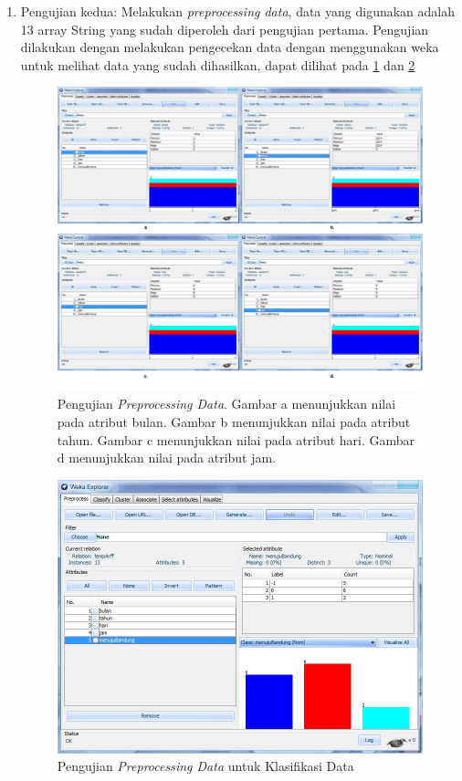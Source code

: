 \begin{enumerate}
	\item Pengujian kedua: Melakukan \textsl{preprocessing data}, data yang digunakan adalah 13 array String yang sudah diperoleh dari pengujian pertama. Pengujian dilakukan dengan melakukan pengecekan data dengan menggunakan weka untuk melihat data yang sudah dihasilkan, dapat dilihat pada \ref{fig:Pengujian214} dan \ref{fig:Pengujian25} 
	
	\begin{figure}[H]
	\centering
	\includegraphics[scale=0.4]{Gambar/pengujian214.jpg}
	\caption[Pengujian \textsl{Preprocessing Data}]{Pengujian \textsl{Preprocessing Data}. Gambar a menunjukkan nilai pada atribut bulan. Gambar b menunjukkan nilai pada atribut tahun. Gambar c menunjukkan nilai pada atribut hari. Gambar d menunjukkan nilai pada atribut jam.} 
	\label{fig:Pengujian214}
	\end{figure}
	
	\begin{figure}[H]
	\centering
	\includegraphics[scale=0.4]{Gambar/pengujian25.jpg}
	\caption[Pengujian \textsl{Preprocessing Data} untuk Klasifikasi Data]{Pengujian \textsl{Preprocessing Data} untuk Klasifikasi Data} 
	\label{fig:Pengujian25}
	\end{figure}


\end{enumerate}
